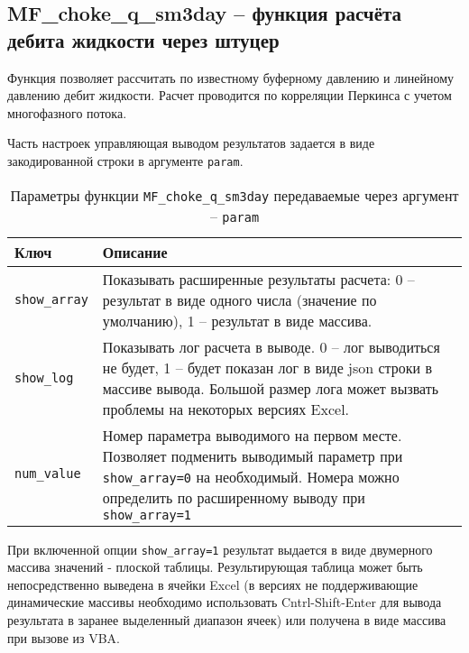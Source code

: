 \subsection{MF\_choke\_q\_sm3day – функция расчёта дебита жидкости через штуцер}
Функция позволяет рассчитать по известному буферному давлению и линейному давлению дебит жидкости. Расчет  проводится по корреляции Перкинса \cite{Perkins_1993} с учетом многофазного потока.  


Часть настроек управляющая выводом результатов задается в виде закодированной строки в аргументе \texttt{param}.

\begin{table}[H]
	\caption{Параметры функции  \texttt{MF_choke_q_sm3day} передаваемые через аргумент -- \texttt{param}}
	\label{table:param_list_choke_q_1}
	\begin{tabular}{p{}p{}}
		\hline
		Ключ & Описание  \\ \hline
		\texttt{show_array} & Показывать расширенные результаты расчета: 0 -- результат в виде одного числа (значение по умолчанию), 1 -- результат в виде массива.    \\ \hline
		
		\texttt{show_log} & Показывать лог расчета в выводе. 0 -- лог выводиться не будет, 1 -- будет показан лог в виде json строки в массиве вывода. Большой размер лога может вызвать проблемы на некоторых версиях Excel.   \\ \hline
		
		\texttt{num_value} & Номер параметра выводимого на первом месте. Позволяет подменить выводимый параметр при \texttt{show_array=0} на необходимый. Номера можно определить по расширенному выводу при \texttt{show_array=1}  \\ \hline
		
	\end{tabular}
\end{table}

При включенной опции \texttt{show_array=1} результат выдается в виде двумерного массива значений - плоской таблицы. Результирующая таблица может быть непосредственно выведена в ячейки Excel (в версиях не поддерживающие динамические массивы необходимо использовать Cntrl-Shift-Enter для вывода результата в заранее выделенный диапазон ячеек) или получена в виде массива при вызове из VBA.

